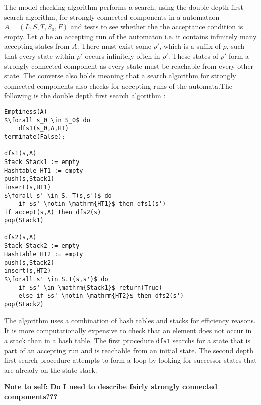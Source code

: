 The model checking algorithm performs a search, using the double depth first search algorithm, for strongly connected components in a \Buchi automataon $A = (L,S,T, S_0, F)$ and tests to see whether the the acceptance condition is empty. Let $\rho$ be an accepting run of the automaton i.e. it contains infinitely many accepting states from $A$.  There must exist some $\rho'$, which is a suffix of $\rho$, such that every state within $\rho'$ occurs infinitely often in $\rho'$. These states of $\rho'$ form a strongly connected component as every state must be reachable from every other state. The converse also holds meaning that a search algorithm for strongly connected components also checks for accepting runs of the automata.The following is the double depth first search algorithm \cite{CC91,GH96}:

\begin{lstlisting}[caption = The double depth first search algorithm, mathescape]
Emptiness(A)
$\forall s_0 \in S_0$ do
	dfs1(s_0,A,HT)
terminate(False);

dfs1(s,A)
Stack Stack1 := empty
Hashtable HT1 := empty
push(s,Stack1)
insert(s,HT1)
$\forall s' \in S. T(s,s')$ do
	if $s' \notin \mathrm{HT1}$ then dfs1(s')
if accept(s,A) then dfs2(s)
pop(Stack1)

dfs2(s,A)
Stack Stack2 := empty
Hashtable HT2 := empty
push(s,Stack2)
insert(s,HT2)
$\forall s' \in S.T(s,s')$ do
	if $s' \in \mathrm{Stack1}$ return(True)
	else if $s' \notin \mathrm{HT2}$ then dfs2(s')
pop(Stack2)
\end{lstlisting}

The algorithm uses a combination of hash tables and stacks for efficiency reasons. It is more computationally expensive to check that an element does not occur in a stack than in a hash table. The first procedure \texttt{dfs1} searchs for a state that is part of an accepting run and  is reachable from an initial state. The second depth first search procedure attempts to form a loop by looking for successor states that are already on the state stack. 


\textbf{Note to self: Do I need to describe fairly strongly connected components???}



